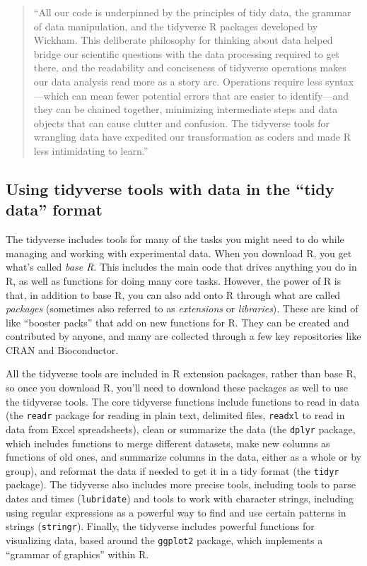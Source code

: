 \documentclass[]{tufte-book}
\begin{document}
\begin{quote}
``All our code is underpinned by the principles of tidy data, the
grammar of data manipulation, and the tidyverse R packages developed
by Wickham. This deliberate philosophy for thinking
about data helped bridge our scientific questions with the data processing
required to get there, and the readability and conciseness of
tidyverse operations makes our data analysis read more as a story
arc. Operations require less syntax---which can mean fewer potential
errors that are easier to identify---and they can be chained together,
minimizing intermediate steps and data objects that can cause clutter and
confusion. The tidyverse tools for wrangling data have
expedited our transformation as coders and made R less intimidating to
learn.'' \citep{lowndes2017our}
\end{quote}

\hypertarget{using-tidyverse-tools-with-data-in-the-tidy-data-format}{%
\subsection{Using tidyverse tools with data in the ``tidy data'' format}\label{using-tidyverse-tools-with-data-in-the-tidy-data-format}}

The tidyverse includes tools for many of the tasks you might need to
do while managing and working with experimental data. When you download
R, you get what's called \emph{base R}. This includes the main code that drives
anything you do in R, as well as functions for doing many core tasks.
However, the power of R is that, in addition to base R, you can also add
onto R through what are called \emph{packages} (sometimes also referred to
as \emph{extensions} or \emph{libraries}). These are kind of like ``booster packs''
that add on new functions for R. They can be created and contributed
by anyone, and many are collected through a few key repositories like
CRAN and Bioconductor.

All the tidyverse tools are included in R extension packages, rather than base
R, so once you download R, you'll need to download these packages as well to use
the tidyverse tools. The core tidyverse functions include functions to read in
data (the \texttt{readr} package for reading in plain text, delimited files, \texttt{readxl}
to read in data from Excel spreadsheets), clean or summarize the data (the
\texttt{dplyr} package, which includes functions to merge different datasets, make
new columns as functions of old ones, and summarize columns in the data, either
as a whole or by group), and reformat the data if needed to get it in a tidy
format (the \texttt{tidyr} package). The tidyverse also includes more precise tools,
including tools to parse dates and times (\texttt{lubridate}) and tools to work with
character strings, including using regular expressions as a powerful way to find
and use certain patterns in strings (\texttt{stringr}). Finally, the tidyverse
includes powerful functions for visualizing data, based around the \texttt{ggplot2}
package, which implements a ``grammar of graphics'' within R.
\end{document}

